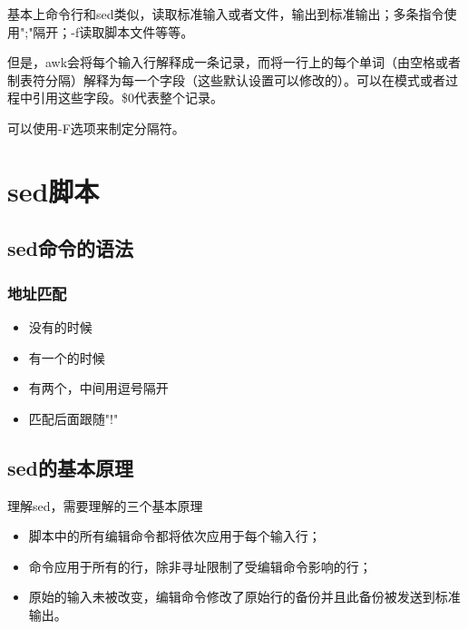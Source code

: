 基本上命令行和sed类似，读取标准输入或者文件，输出到标准输出；多条指令使用";"隔开；-f读取脚本文件等等。

但是，awk会将每个输入行解释成一条记录，而将一行上的每个单词（由空格或者制表符分隔）解释为每一个字段（这些默认设置可以修改的）。可以在模式或者过程中引用这些字段。\$0代表整个记录。


可以使用-F选项来制定分隔符。


\section{sed脚本}

\subsection{sed命令的语法}

\subsubsection{地址匹配}
\begin{itemize}
\item 没有的时候
\item 有一个的时候
\item 有两个，中间用逗号隔开
\item 匹配后面跟随"!"
\end{itemize}

\subsection{sed的基本原理}

理解sed，需要理解的三个基本原理
\begin{itemize}
\item 脚本中的所有编辑命令都将依次应用于每个输入行；
\item 命令应用于所有的行，除非寻址限制了受编辑命令影响的行；
\item 原始的输入未被改变，编辑命令修改了原始行的备份并且此备份被发送到标准输出。
\end{itemize}

